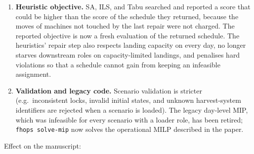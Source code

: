 \begin{enumerate}
  \begin{itemize}
  \tightlist
  \item
    staged inventories are now kept per upstream role (E7), so a role
    with several upstream roles processes only wood that each of them
    has staged;
  \item
    each role's output is capped at the volume the block still holds
    (E12), the head-start buffer is waived once the upstream roles have
    finished the block (E8c), and the loader threshold is the smaller of
    one truckload and the remaining volume (E9);
  \item
    landing capacity is enforced per shift and is hard at the default
    weight (E11); in 1.0.0 it was counted per day with a slack that cost
    nothing at the default weight, so it did not bind;
  \item
    machine moves are charged also when a machine idles between two
    blocks, and staying on a block is no longer charged (E6);
  \item
    the loader batching variables of 1.0.0, which imposed no
    restriction, were removed;
  \item
    timeline blackouts are enforced in the MILP (E1), and blocks without
    a harvest system carry no role obligations (E2).
  \end{itemize}
\item
  \textbf{Heuristic objective.} SA, ILS, and Tabu searched and reported
  a score that could be higher than the score of the schedule they
  returned, because the moves of machines not touched by the last repair
  were not charged. The reported objective is now a fresh evaluation of
  the returned schedule. The heuristics' repair step also respects
  landing capacity on every day, no longer starves downstream roles on
  capacity-limited landings, and penalises hard violations so that a
  schedule cannot gain from keeping an infeasible assignment.
\item
  \textbf{Validation and legacy code.} Scenario validation is stricter
  (e.g.~inconsistent locks, invalid initial states, and unknown
  harvest-system identifiers are rejected when a scenario is loaded).
  The legacy day-level MIP, which was infeasible for every scenario with
  a loader role, has been retired; \texttt{fhops\ solve-mip} now solves
  the operational MILP described in the paper.
\end{enumerate}

Effect on the manuscript:

